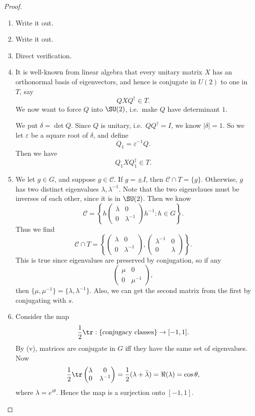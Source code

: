 \documentclass[a4paper]{article}
\begin{document}
\begin{proof}\leavevmode
  \begin{enumerate}
    \item Write it out.
    \item Write it out.
    \item Direct verification.
    \item It is well-known from linear algebra that every unitary matrix $X$ has an orthonormal basis of eigenvectors, and hence is conjugate in $U(2)$ to one in $T$, say
      \[
        Q X Q^\dagger \in T.
      \]
      We now want to force $Q$ into $\SU(2)$, i.e.\ make $Q$ have determinant $1$.

      We put $\delta = \det Q$. Since $Q$ is unitary, i.e.\ $QQ^\dagger = I$, we know $|\delta| = 1$. So we let $\varepsilon$ be a square root of $\delta$, and define
      \[
        Q_1 = \varepsilon^{-1} Q.
      \]
      Then we have
      \[
        Q_1 X Q_1^{\dagger} \in T.
      \]
    \item We let $g \in G$, and suppose $g \in \mathcal{C}$. If $g = \pm I$, then $\mathcal{C} \cap T = \{g\}$. Otherwise, $g$ has two distinct eigenvalues $\lambda, \lambda^{-1}$. Note that the two eigenvlaues must be inverses of each other, since it is in $\SU(2)$. Then we know
      \[
        \mathcal{C} = \left\{h
          \begin{pmatrix}
            \lambda & 0\\
            0 & \lambda^{-1}
          \end{pmatrix}h^{-1} : h \in G
        \right\}.
      \]
      Thus we find
      \[
        \mathcal{C} \cap T = \left\{
          \begin{pmatrix}
            \lambda & 0\\
            0 & \lambda^{-1}
          \end{pmatrix},
          \begin{pmatrix}
            \lambda^{-1} & 0\\
            0 & \lambda
          \end{pmatrix}
        \right\}.
      \]
      This is true since eigenvalues are preserved by conjugation, so if any
      \[
        \begin{pmatrix}
          \mu & 0\\
          0 & \mu^{-1}
        \end{pmatrix},
      \]
      then $\{\mu, \mu^{-1}\} = \{\lambda, \lambda^{-1}\}$. Also, we can get the second matrix from the first by conjugating with $s$.
    \item Consider the map
      \[
        \frac{1}{2} \tr: \{\text{conjugacy classes}\} \to [-1, 1].
      \]
      By (v), matrices are conjugate in $G$ iff they have the same set of eigenvalues. Now
      \[
        \frac{1}{2}\tr
        \begin{pmatrix}
          \lambda & 0\\
          0 & \lambda^{-1}
        \end{pmatrix}
        = \frac{1}{2}(\lambda + \bar{\lambda}) = \Re(\lambda) = \cos \theta,
      \]
      where $\lambda = e^{i\theta}$. Hence the map is a surjection onto $[-1, 1]$.


\end{enumerate}
\end{proof}
\end{document}
